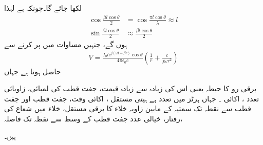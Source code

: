 لکھا جائے گا۔چونکہ  ہے لہٰذا 
\begin{align*}
\cos \frac{\beta l \cos \theta}{2}&=\cos \frac{\pi l \cos \theta}{\lambda}\approx l\\
\sin \frac{\beta l \cos \theta}{2}&\approx \frac{\beta l \cos \theta}{2}
\end{align*}
ہوں گے، جنہیں مساوات  میں پر کرنے سے
\begin{align}\label{مساوات_اینٹینا_غیر_سمتی_دباو_ت}
V=\frac{I_0 l e^{j(\omega t -\beta r)} \cos \theta}{4\pi \epsilon_0 c}\left(\frac{1}{r}+\frac{c}{j\omega r^2} \right)
\end{align}
حاصل ہوتا ہے جہاں
\begin{description}
 برقی رو کا حیطہ یعنی اس کی زیادہ سے زیادہ قیمت، 
 جفت قطب کی لمبائی، 
  زاویائی تعدد  ، اکائی ۔ جہاں ہرٹز میں تعدد  ہے
 ہیتی مستقل ، اکائی 
وقت، 
جفت قطب اور جفت قطب سے نقطہ  تک سمتیہ کے مابین زاویہ
خلاء کا برقی مستقل، 
خلاء میں شعاع کی رفتار، 
خیالی عدد 
جفت قطب کے وسط سے نقطہ  تک فاصلہ،
\end{description}
ہیں۔

